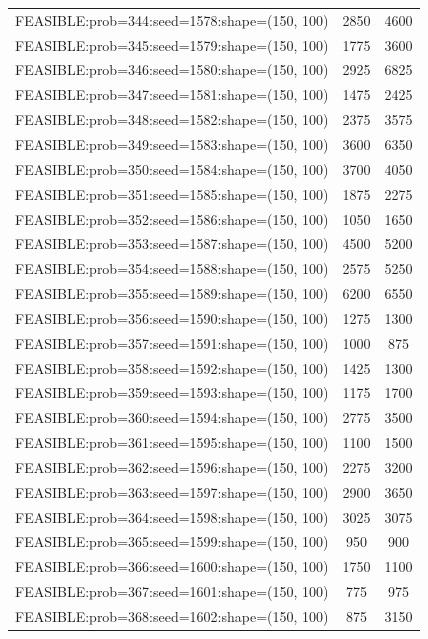 \begin{longtable}{lcc}
FEASIBLE:prob=344:seed=1578:shape=(150, 100) &     2850 &  4600 \\
FEASIBLE:prob=345:seed=1579:shape=(150, 100) &     1775 &  3600 \\
FEASIBLE:prob=346:seed=1580:shape=(150, 100) &     2925 &  6825 \\
FEASIBLE:prob=347:seed=1581:shape=(150, 100) &     1475 &  2425 \\
FEASIBLE:prob=348:seed=1582:shape=(150, 100) &     2375 &  3575 \\
FEASIBLE:prob=349:seed=1583:shape=(150, 100) &     3600 &  6350 \\
FEASIBLE:prob=350:seed=1584:shape=(150, 100) &     3700 &  4050 \\
FEASIBLE:prob=351:seed=1585:shape=(150, 100) &     1875 &  2275 \\
FEASIBLE:prob=352:seed=1586:shape=(150, 100) &     1050 &  1650 \\
FEASIBLE:prob=353:seed=1587:shape=(150, 100) &     4500 &  5200 \\
FEASIBLE:prob=354:seed=1588:shape=(150, 100) &     2575 &  5250 \\
FEASIBLE:prob=355:seed=1589:shape=(150, 100) &     6200 &  6550 \\
FEASIBLE:prob=356:seed=1590:shape=(150, 100) &     1275 &  1300 \\
FEASIBLE:prob=357:seed=1591:shape=(150, 100) &     1000 &   875 \\
FEASIBLE:prob=358:seed=1592:shape=(150, 100) &     1425 &  1300 \\
FEASIBLE:prob=359:seed=1593:shape=(150, 100) &     1175 &  1700 \\
FEASIBLE:prob=360:seed=1594:shape=(150, 100) &     2775 &  3500 \\
FEASIBLE:prob=361:seed=1595:shape=(150, 100) &     1100 &  1500 \\
FEASIBLE:prob=362:seed=1596:shape=(150, 100) &     2275 &  3200 \\
FEASIBLE:prob=363:seed=1597:shape=(150, 100) &     2900 &  3650 \\
FEASIBLE:prob=364:seed=1598:shape=(150, 100) &     3025 &  3075 \\
FEASIBLE:prob=365:seed=1599:shape=(150, 100) &      950 &   900 \\
FEASIBLE:prob=366:seed=1600:shape=(150, 100) &     1750 &  1100 \\
FEASIBLE:prob=367:seed=1601:shape=(150, 100) &      775 &   975 \\
FEASIBLE:prob=368:seed=1602:shape=(150, 100) &      875 &  3150 \\

\end{longtable}
